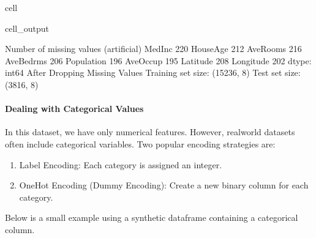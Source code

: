 \documentclass[letterpaper,10pt,english]{jupyterBook}
\begin{document}
\begin{sphinxuseclass}{cell}
\begin{sphinxVerbatimOutput}
\begin{sphinxuseclass}{cell_output}
\begin{sphinxVerbatim}[commandchars=\\\{\}]
\PYGZhy{}\PYGZhy{}\PYGZhy{} Number of missing values (artificial) \PYGZhy{}\PYGZhy{}\PYGZhy{}
MedInc        220
HouseAge      212
AveRooms      216
AveBedrms     206
Population    196
AveOccup      195
Latitude      208
Longitude     202
dtype: int64
\PYGZhy{}\PYGZhy{}\PYGZhy{} After Dropping Missing Values \PYGZhy{}\PYGZhy{}\PYGZhy{}
Training set size: (15236, 8)
Test set size: (3816, 8)
\end{sphinxVerbatim}

\end{sphinxuseclass}\end{sphinxVerbatimOutput}

\end{sphinxuseclass}

\paragraph{Dealing with Categorical Values}
\label{\detokenize{03:dealing-with-categorical-values}}
\sphinxAtStartPar
In this dataset, we have only numerical features. However, real\sphinxhyphen{}world datasets often include categorical variables. Two popular encoding strategies are:
\begin{enumerate}
%
\item {} 
\sphinxAtStartPar
Label Encoding: Each category is assigned an integer.

\item {} 
\sphinxAtStartPar
One\sphinxhyphen{}Hot Encoding (Dummy Encoding): Create a new binary column for each category.

\end{enumerate}

\sphinxAtStartPar
Below is a small example using a synthetic dataframe containing a categorical column.
\end{document}
